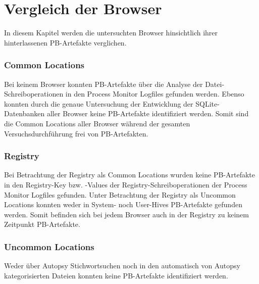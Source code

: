 \chapter{Vergleich der Browser}
\label{chapter:vergleich-der-browser}

In diesem Kapitel werden die untersuchten Browser hinsichtlich ihrer hinterlassenen PB-Artefakte verglichen.

\subsection*{Common Locations}
Bei keinem Browser konnten PB-Artefakte über die Analyse der Datei-Schreiboperationen in den Process Monitor Logfiles gefunden werden.
Ebenso konnten durch die genaue Untersuchung der Entwicklung der SQLite-Datenbanken aller Browser keine PB-Artefakte identifiziert werden.
Somit sind die Common Locations aller Browser während der gesamten Versuchsdurchführung frei von PB-Artefakten.

\subsection*{Registry}
Bei Betrachtung der Registry als Common Locations wurden keine PB-Artefakte in den Registry-Key bzw. -Values der Registry-Schreiboperationen der Process Monitor Logfiles gefunden.
Unter Betrachtung der Registry als Uncommon Locations konnten weder in System- noch User-Hives PB-Artefakte gefunden werden.
Somit befinden sich bei jedem Browser auch in der Registry zu keinem Zeitpunkt PB-Artefakte.

\subsection*{Uncommon Locations}
Weder über Autopsy Stichwortsuchen noch in den automatisch von Autopsy kategorisierten Dateien konnten keine PB-Artefakte identifiziert werden.

